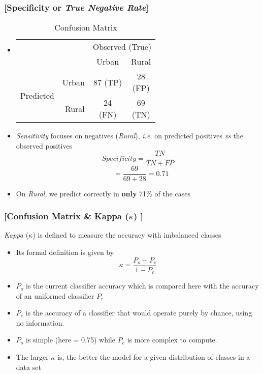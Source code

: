 \documentclass[xcolor=x11names,compress, handhouts]{beamer}
\renewcommand{\(}{\begin{columns}}
\renewcommand{\)}{\end{columns}}
\newcommand{\<}[1]{\begin{column}{#1}}
\renewcommand{\>}{\end{column}}
\begin{document}
\begin{frame} %
\frametitle{\textcolor{brique}{[Specificity or \textit{True Negative Rate}]}}
\begin{itemize}[<+->]
  \item[]
    \begin{table}[]
    \begin{tabular}{l r|c|c|}

                              & & \multicolumn{2}{c|}{Observed (True)}                                                                                          \\
                              & &    Urban  &  Rural  \\  \hline
    \multirow{2}{*}{Predicted}& Urban & \shortstack[c]{$87$ \\ \tiny{(TP)}}& \shortstack[c]{28 \\ \tiny{(FP)}} \\ \cline{2-4}
                              & Rural &  \shortstack[c]{24 \\ \tiny{(FN)}}& \shortstack[c]{69 \\ \tiny{(TN)}} \\ \hline
    \end{tabular}
    \caption{Confusion Matrix}
    \end{table}
  \item \textit{Sensitivity} focuses on  negatives (\textit{Rural}), \textit{i.e.} on predicted positives \textit{vs} the observed positives
   $$ Specificity = \frac{TN}{TN + FP} $$
   $$
 \; \; \;  =  \frac{69}{69+28} = 0.71
 $$
  \item On \textit{Rural}, we predict correctly in \textbf{only} 71\% of the cases
\end{itemize}
\end{frame}

\begin{frame} %
\frametitle{\textcolor{brique}{[Confusion Matrix  \& Kappa ($\kappa$) ]}}
\emph{Kappa} ($\kappa$) is defined to measure the accuracy with imbalanced classes
\begin{itemize}[<+->]
  \item[] Its formal definition is given by
  $$ \kappa = \frac{P_o - P_e}{1 - P_e}  $$
  \item[]$P_o$ is the current classifier accuracy which is compared here with the accuracy of an uniformed classifier $P_e$
  \item[] $P_e$ is the accuracy of a classifier that would operate purely by chance, using no information.
  \item $P_o$ is simple (here = 0.75) while  $P_e$  is more complex to compute.
  \item  The larger $\kappa $ is, the better the model for a given distribution of classes in a data set
  \end{itemize}
\end{frame}
\end{document}
